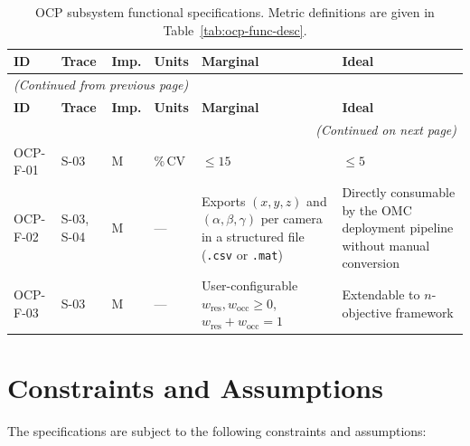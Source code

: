 {\small\setlength{\tabcolsep}{4pt}
\begin{longtable}{p{1.5cm} p{1.8cm} p{0.7cm} p{1.0cm} >{\raggedright\arraybackslash}p{\dimexpr(\linewidth-1.5cm-1.8cm-0.7cm-1.0cm-12\tabcolsep)/2\relax} >{\raggedright\arraybackslash}p{\dimexpr(\linewidth-1.5cm-1.8cm-0.7cm-1.0cm-12\tabcolsep)/2\relax}}
\caption[OCP subsystem functional specifications.]{OCP subsystem functional specifications. Metric definitions are given in Table~\ref{tab:ocp-func-desc}.}
\label{tab:ocp-func}\\
\toprule
\textbf{ID} & \textbf{Trace} & \textbf{Imp.} & \textbf{Units} & \textbf{Marginal} & \textbf{Ideal} \\
\midrule
\endfirsthead
\multicolumn{6}{l}{\small\textit{(Continued from previous page)}}\\[2pt]
\toprule
\textbf{ID} & \textbf{Trace} & \textbf{Imp.} & \textbf{Units} & \textbf{Marginal} & \textbf{Ideal} \\
\midrule
\endhead
\midrule
\multicolumn{6}{r}{\small\textit{(Continued on next page)}}\\
\endfoot
\bottomrule
\endlastfoot
OCP-F-01 & S-03 & M & \%\,CV & $\leq 15$ & $\leq 5$ \\[4pt]
OCP-F-02 & S-03, S-04 & M & --- & Exports $(x,y,z)$ and $(\alpha,\beta,\gamma)$ per camera in a structured file (\texttt{.csv} or \texttt{.mat}) & Directly consumable by the OMC deployment pipeline without manual conversion \\[4pt]
OCP-F-03 & S-03 & M & --- & User-configurable $w_{\text{res}}, w_{\text{occ}} \geq 0$,\newline $w_{\text{res}} + w_{\text{occ}} = 1$ & Extendable to $n$-objective framework \\
\end{longtable}}

\section{Constraints and Assumptions}

The specifications are subject to the following constraints and assumptions:


